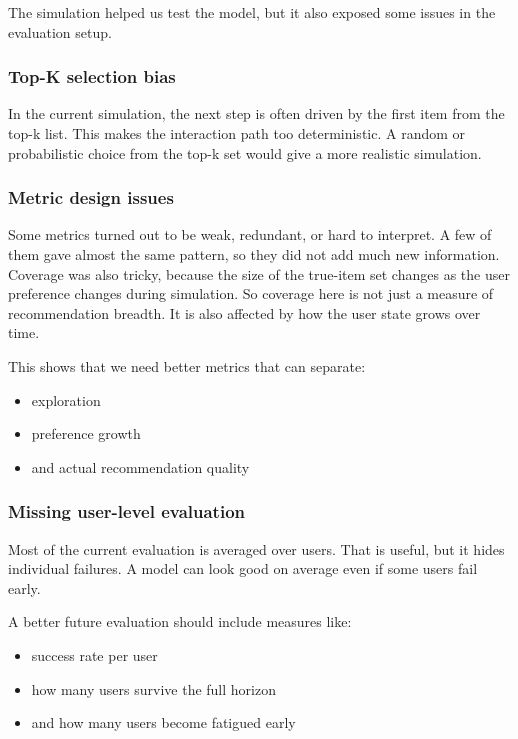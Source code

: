 The simulation helped us test the model, but it also exposed some issues in the evaluation setup.

\subsubsection{Top-K selection bias}

In the current simulation, the next step is often driven by the first item from the top-k list. 
This makes the interaction path too deterministic. 
A random or probabilistic choice from the top-k set would give a more realistic simulation.

\subsubsection{Metric design issues}

Some metrics turned out to be weak, redundant, or hard to interpret. 
A few of them gave almost the same pattern, so they did not add much new information. 
Coverage was also tricky, because the size of the true-item set changes as the user preference changes during simulation. 
So coverage here is not just a measure of recommendation breadth. 
It is also affected by how the user state grows over time.

This shows that we need better metrics that can separate:

\begin{itemize}
    \item exploration
    \item preference growth
    \item and actual recommendation quality
\end{itemize}

\subsubsection{Missing user-level evaluation}

Most of the current evaluation is averaged over users. 
That is useful, but it hides individual failures. 
A model can look good on average even if some users fail early.

A better future evaluation should include measures like:

\begin{itemize}
    \item success rate per user
    \item how many users survive the full horizon
    \item and how many users become fatigued early
\end{itemize}


